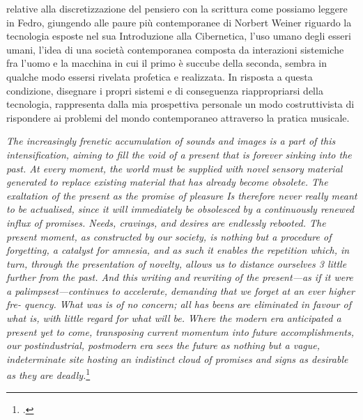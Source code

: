 relative alla discretizzazione del pensiero con la scrittura
come possiamo leggere in Fedro, 
giungendo alle paure più contemporanee di Norbert Weiner riguardo la tecnologia
esposte nel sua Introduzione alla Cibernetica, l'uso umano degli esseri umani,
l'idea di una società contemporanea composta da interazioni sistemiche fra l'uomo e la macchina
in cui il primo è succube della seconda, sembra in qualche modo essersi rivelata profetica e realizzata.
In risposta a questa condizione, disegnare i propri sistemi e di conseguenza riappropriarsi della tecnologia,
rappresenta dalla mia prospettiva personale un modo costruttivista di rispondere ai problemi del mondo contemporaneo
attraverso la pratica musicale.

\begin{center}
    \vspace{0.5cm}
    \textit{The increasingly frenetic accumulation of sounds and
images is a part of this intensification, aiming to fill the void of
a present that is forever sinking into the past. At every
moment, the world must be supplied with novel sensory
material generated to replace existing material that has
already become obsolete. The exaltation of the present as the
promise of pleasure Is therefore never really meant to be actualised,
since it will immediately be obsolesced by a continuously
renewed influx of promises.
Needs, cravings, and desires
are endlessly rebooted.
The present moment, as constructed by our society, is
nothing but a procedure of forgetting, a catalyst for amnesia,
and as such it enables the repetition which, in turn, through
the presentation of novelty, allows us to distance ourselves
3 little further from the past. And this writing and rewriting
of the present—as if it were a palimpsest—continues to
accelerate, demanding that we forget at an ever higher fre-
quency. What was is of no concern; all has beens are eliminated
in favour of what is, with little regard for what will be.
Where the modern era anticipated a present yet to come,
transposing current momentum into future accomplishments,
our postindustrial, postmodern era sees the future as
nothing but a vague, indeterminate site hosting an indistinct
cloud of promises and signs as desirable as they are deadly.}\footcite{francois_jbonnet_after_death}
\vspace{0.5cm}
\end{center}

